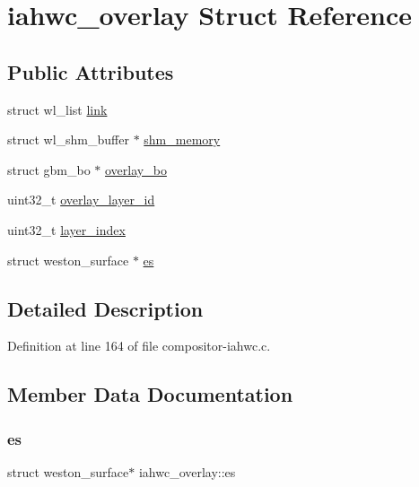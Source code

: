 \hypertarget{structiahwc__overlay}{}\section{iahwc\+\_\+overlay Struct Reference}
\label{structiahwc__overlay}
\subsection*{Public Attributes}
\begin{DoxyCompactItemize}
\item 
struct wl\+\_\+list \mbox{\hyperlink{structiahwc__overlay_abfac33082f2c2b4e73136504d30ab648}{link}}
\item 
struct wl\+\_\+shm\+\_\+buffer $\ast$ \mbox{\hyperlink{structiahwc__overlay_a4ab6d321c6af6b1668b0bfe22081544c}{shm\+\_\+memory}}
\item 
struct gbm\+\_\+bo $\ast$ \mbox{\hyperlink{structiahwc__overlay_a50c366179b37b8ae5a6249fb0d6215d0}{overlay\+\_\+bo}}
\item 
uint32\+\_\+t \mbox{\hyperlink{structiahwc__overlay_a5e83b093028ccc18d0d688ffae5b078f}{overlay\+\_\+layer\+\_\+id}}
\item 
uint32\+\_\+t \mbox{\hyperlink{structiahwc__overlay_a3bd8d80d39125387f50e37d80516cc9a}{layer\+\_\+index}}
\item 
struct weston\+\_\+surface $\ast$ \mbox{\hyperlink{structiahwc__overlay_aef4d5a2d068b69fef352b918ffc17163}{es}}
\end{DoxyCompactItemize}


\subsection{Detailed Description}


Definition at line 164 of file compositor-\/iahwc.\+c.



\subsection{Member Data Documentation}
\mbox{\label{structiahwc__overlay_aef4d5a2d068b69fef352b918ffc17163}} 
\subsubsection{\texorpdfstring{es}{es}}
{\footnotesize\ttfamily struct weston\+\_\+surface$\ast$ iahwc\+\_\+overlay\+::es}



